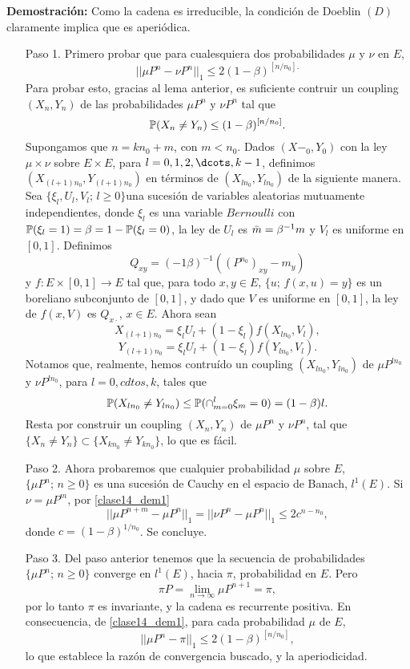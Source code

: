 \textbf{Demostración: }Como la cadena es irreducible, la condición de Doeblin $(D)$ claramente implica que es aperiódica.
\begin{itemize}
    \item[Paso 1.] Primero probar que para cualesquiera dos probabilidades $\mu$ y $\nu$ en $E$,
    \begin{equation}
        ||\mu P^n - \nu P^n||_1 \leq 2(1-\beta)^{[n/n_0].}
        \label{clase14_dem1}
    \end{equation}
    Para probar esto, gracias al lema anterior, es suficiente contruir un coupling $(X_n,Y_n)$ de las probabilidades $\mu P^n$ y $\nu P^n$ tal que
    \[\mathbb{P}(X_n \neq Y_n) \leq (1-\beta)^{[n/n_0]}.\]
    Supongamos que  $n = kn_0 + m$, con $m<n_0$. Dados $(X-_0,Y_0)$ con la ley $\mu \times \nu$ sobre $E\times E$, para $l = 0,1,2,\dcots,k-1$, definimos $(X_{(l+1)n_0},Y_{(l+1)n_0})$ en términos de $(X_{ln_0},Y_{ln_0})$ de la siguiente manera. Sea $\{\xi_l , U_l, V_l;\,l\geq 0\}$una sucesión de variables aleatorias mutuamente independientes, donde $\xi_l$ es una variable $Bernoulli$ con $\mathbb{P}(\xi_l = 1)=\beta = 1 -\mathbb{P}(\xi_l = 0)$, la ley de $U_l$ es $\Bar{m} = \beta^{-1}m$ y $V_l$ es uniforme en $[0,1]$. Definimos
    \[Q_{xy} = (-1\beta)^{-1}((P^{n_0})_{xy}-m_y)\]
    y $f:E\times [0,1] \rightarrow E$ tal que, para todo $x,y\in E$, $\{u;\,f(x,u)=y\}$ es un boreliano subconjunto de $[0,1]$, y dado que $V$ es uniforme en $[0,1]$, la ley de $f(x,V)$ es $Q_{x\cdot}$, $x\in E$. Ahora sean
    \[X_{(l+1)n_0} = \xi_l U_l + (1-\xi_l)f(X_{ln_0},V_l),\]
    \[Y_{(l+1)n_0} = \xi_l U_l + (1-\xi_l)f(Y_{ln_0},V_l).\]
    Notamos que, realmente, hemos contruído un coupling $(X_{ln_0},Y_{ln_0})$ de $\mu P^{ln_0}$ y $\nu P^{ln_0}$, para $l=0,cdtos,k$, tales que
    \[\mathbb{P}(X_{ln_0} \neq Y_{ln_0}) \leq  \mathbb{P}(\cap_{m=0}^l \xi_m =0) = (1-\beta)l.\]
    Resta por construir un coupling $(X_n,Y_n)$ de $\mu P^n$ y $\nu P^n$, tal que $\{X_n \neq Y_n\} \subset \{X_{kn_0} \neq Y_{kn_0}\}$, lo  que es fácil.
    \item[Paso 2.] Ahora probaremos que cualquier probabilidad $\mu$ sobre $E$, $\{\mu P^n;\,n\geq 0\}$ es una sucesión de Cauchy en el espacio de Banach, $l^1(E)$. Si $\nu = \mu P^m$, por \ref{clase14_dem1} 
    \[||\mu P^{n+m}-\mu P^n||_1 = ||\nu P^n - \mu P^n||_1 \leq 2c^{n-n_0},\]
    donde $c=(1-\beta)^{1/n_0}$. Se concluye.
    \item[Paso 3.] Del paso anterior tenemos que la secuencia de probabilidades $\{\mu P^n;\,n\geq 0\}$ converge en $l^1(E)$, hacia $\pi$, probabilidad en $E$. Pero
    \[\pi P = \lim_{n\rightarrow \infty}\mu P^{n+1} = \pi,\]
    por lo tanto $\pi$ es invariante, y la cadena es recurrente positiva. En consecuencia, de \ref{clase14_dem1}, para cada probabilidad $\mu$ de $E$,
    \[||\mu P^n - \pi||_1 \leq 2(1-\beta)^{[n/n_0]},\]
    lo que establece la razón de convergencia buscado, y la aperiodicidad.
\end{itemize}
